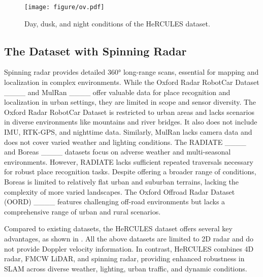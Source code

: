 \begin{figure}[!t]
    \centering
    \texttt{[image: figure/ov.pdf]}
    \caption{Day, dusk, and night conditions of the HeRCULES dataset.}
    \label{fig:overview}
    \vspace{-8mm}
\end{figure}



\subsection{The Dataset with Spinning Radar}
Spinning radar provides detailed 360° long-range scans, essential for mapping and localization in complex environments. While the Oxford Radar RobotCar Dataset ____ and MulRan ____ offer valuable data for place recognition and localization in urban settings, they are limited in scope and sensor diversity. The Oxford Radar RobotCar Dataset is restricted to urban areas and lacks scenarios in diverse environments like mountains and river bridges. It also does not include \ac{IMU}, RTK-GPS, and nighttime data. Similarly, MulRan lacks camera data and does not cover varied weather and lighting conditions. The RADIATE ____ and Boreas ____ datasets focus on adverse weather and multi-seasonal environments. However, RADIATE lacks sufficient repeated traversals necessary for robust place recognition tasks. Despite offering a broader range of conditions, Boreas is limited to relatively flat urban and suburban terrains, lacking the complexity of more varied landscapes. The Oxford Offroad Radar Dataset (OORD) ____ features challenging off-road environments but lacks a comprehensive range of urban and rural scenarios.

Compared to existing datasets, the HeRCULES dataset offers several key advantages, as shown in . All the above datasets are limited to 2D radar and do not provide Doppler velocity information. In contrast, HeRCULES combines 4D radar, \ac{FMCW} \ac{LiDAR}, and spinning radar, providing enhanced robustness in SLAM across diverse weather, lighting, urban traffic, and dynamic conditions.
